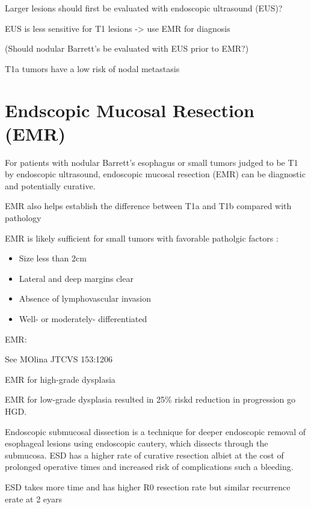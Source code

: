 \documentclass[
]{book}
\providecommand{\tightlist}{%
  \setlength{\itemsep}{0pt}\setlength{\parskip}{0pt}}
\begin{document}
Larger lesions should first be evaluated with endoscopic ultrasound (EUS)?

EUS is less sensitive for T1 lesions \citep{bergeron765} -\textgreater{} use EMR for diagnosis \citep{maish1777}

(Should nodular Barrett's be evaluated with EUS prior to EMR?)

T1a tumors have a low risk of nodal metastasis \citep{dunbar850}

\hypertarget{emr}{%
\section{Endscopic Mucosal Resection (EMR)}\label{emr}}

For patients with nodular Barrett's esophagus or small tumors judged to be T1 by endoscopic ultrasound, endoscopic mucosal resection (EMR) can be diagnostic and potentially curative.\citep{thomas1609}

EMR also helps establish the difference between T1a and T1b compared with pathology \citep{worrell484}

EMR is likely sufficient for small tumors with favorable patholgic factors\citep{pech652} \citep{nurkin1090}:

\begin{itemize}
\tightlist
\item
  Size less than 2cm
\item
  Lateral and deep margins clear
\item
  Absence of lymphovascular invasion
\item
  Well- or moderately- differentiated
\end{itemize}

EMR: \citep{soetikno4490}

See MOlina JTCVS 153:1206

EMR for high-grade dysplasia \citep{shaheen2277}

EMR for low-grade dysplasia \citep{phoa1209} resulted in 25\% riskd reduction in progression go HGD.

Endoscopic submucosal dissection is a technique for deeper endoscopic removal of esophageal lesions using endoscopic cautery, which dissects through the submucosa. ESD has a higher rate of curative resection \citep{cao751} albiet at the cost of prolonged operative times and increased risk of complications such a bleeding. \citep{repici715}

ESD takes more time and has higher R0 resection rate but similar recurrence erate at 2 eyars \citep{terheggen783}
\end{document}
